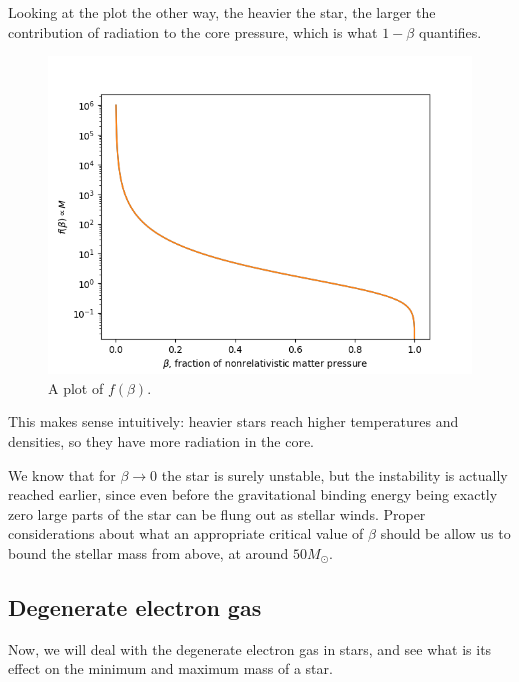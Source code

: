 \documentclass[main.tex]{subfiles}
\begin{document}
Looking at the plot the other way, the heavier the star, the larger the contribution of radiation to the core pressure, which is what \(1-\beta \) quantifies.

\begin{figure}[ht]
\centering
\includegraphics[width=\textwidth]{figures/beta_star_core_pressure.png}
\caption{A plot of \(f(\beta )\).}
\label{fig:beta-core-pressure}
\end{figure}

This makes sense intuitively: heavier stars reach higher temperatures and densities, so they have more radiation in the core. 

We know that for \(\beta \to 0\) the star is surely unstable, but the instability is actually reached earlier, since even before the gravitational binding energy being exactly zero large parts of the star can be flung out as stellar winds.
Proper considerations about what an appropriate critical value of \(\beta \) should be allow us to bound the stellar mass from above, at around \(50 M_{\odot}\). 


\subsection{Degenerate electron gas}

Now, we will deal with the degenerate electron gas in stars, and see what is its effect on the minimum and maximum mass of a star.  
\end{document}
